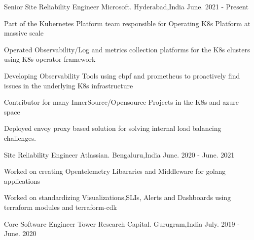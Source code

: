 

\begin{cventries}

    \cventry
    {Senior Site Reliability Engineer} %
    {Microsoft.} %
    {Hyderabad,India} %
    {June. 2021 - Present} %
    {
      \begin{cvitems} %
         \item { Part of the  Kubernetes Platform team responsible for Operating K8s Platform at massive scale }
	       \item { Operated Observability/Log and metrics collection platforms for the K8s clusters using K8s operator framework}
	       \item { Developing Observability Tools using ebpf and prometheus to proactively find issues in the underlying K8s infrastructure}
         \item { Contributor for many InnerSource/Opensource Projects in the K8s and azure space }
         \item { Deployed envoy proxy based solution for solving internal load balancing challenges.} 		
	  \end{cvitems}
    }
    \cventry
    {Site Reliability Engineer} %
    {Atlassian.} %
    {Bengaluru,India} %
    {June. 2020 - June. 2021} %
    {
      \begin{cvitems} %
               \item { Worked on creating Opentelemetry Libararies and Middleware for golang applications }
               \item { Worked on standardizing Visualizations,SLIs, Alerts and Dashboards using terraform modules and terraform-cdk} 		
	  \end{cvitems}
    }
    \cventry
    {Core Software Engineer} %
    {Tower Research Capital.} %
    {Gurugram,India} %
    {July. 2019 - June. 2020} %
    {
      \begin{cvitems} %

\end{cvitems}}
\end{cventries}
